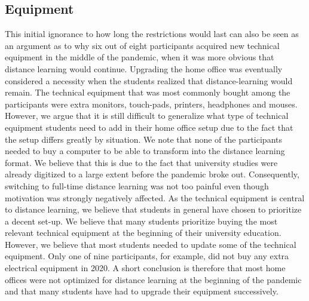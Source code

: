 \documentclass{sigchi}
\begin{document}
\subsection{Equipment}
This initial ignorance to how long the restrictions would last can also be seen as an argument as to why six out of eight participants acquired new technical equipment in the middle of the pandemic, when it was more obvious that distance learning would continue. Upgrading the home office was eventually considered a necessity when the students realized that distance-learning would remain. The technical equipment that was most commonly bought among the participants were extra monitors, touch-pads, printers, headphones and mouses. However, we argue that it is still difficult to generalize what type of technical equipment students need to add in their home office setup due to the fact that the setup differs greatly by situation. We note that none of the participants needed to buy a computer to be able to transform into the distance learning format. We believe that this is due to the fact that university studies were already digitized to a large extent before the pandemic broke out. Consequently, switching to full-time distance learning was not too painful even though motivation was strongly negatively affected. As the technical equipment is central to distance learning, we believe that students in general have chosen to prioritize a decent set-up. We believe that many students prioritize buying the most relevant technical equipment at the beginning of their university education. However, we believe that most students needed to update some of the technical equipment. Only one of nine participants, for example, did not buy any extra electrical equipment in 2020. A short conclusion is therefore that most home offices were not optimized for distance learning at the beginning of the pandemic and that many students have had to upgrade their equipment successively.
\end{document}

